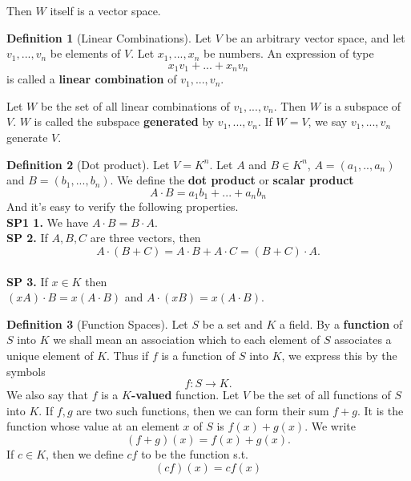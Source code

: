 \documentclass{book}
\theoremstyle{definition}
\newtheorem{definition}{Definition}[section]
\begin{document}
Then $W$ itself is a vector space.
\begin{definition}[Linear Combinations]
    Let $V$ be an arbitrary vector space, and let $v_1, ..., v_n$ be elements of $V$. Let $x_1, ..., x_n$ be numbers. An expression of type
    \begin{equation*}
        x_1v_1 + ... + x_nv_n
    \end{equation*}
    is called a \textbf{linear combination} of $v_1, ..., v_n$.
\end{definition}
Let $W$ be the set of all linear combinations of $v_1,...,v_n$. Then $W$ is a subspace of $V$. $W$ is called the subspace \textbf{generated} by $v_1,...,v_n$. If $W=V$, we say $v_1,...,v_n$ generate $V$.
\begin{definition}[Dot product]
    Let $V = K^n$. Let $A$ and $B \in K^n$, $A=(a_1,..,a_n)$ and $B=(b_1,...,b_n)$. We define the \textbf{dot product} or \textbf{scalar product}
    \begin{equation*}
        A \cdot B = a_1b_1 + ... + a_nb_n
    \end{equation*}
    And it's easy to verify the following properties.
    \\ \textbf{SP1 1.} We have $A \cdot B = B \cdot A$.
    \\ \textbf{SP 2.} If $A,B,C$ are three vectors, then
    \begin{equation*}
        A \cdot (B+C) = A \cdot B + A \cdot C = (B + C) \cdot A.
    \end{equation*}
    \\ \textbf{SP 3.} If $x \in K$ then
    \\ $(xA)\cdot B = x(A\cdot B)$ and $A \cdot (xB) = x(A \cdot B)$.
\end{definition}
\begin{definition}[Function Spaces]
    Let $S$ be a set and $K$ a field. By a \textbf{function} of $S$ into $K$ we shall mean an association which to each element of $S$ associates a unique element of $K$. Thus if $f$ is a function of $S$ into $K$, we express this by the symbols
    \begin{equation*}
        f: S \rightarrow K.
    \end{equation*}
    We also say that $f$ is a $K$\textbf{-valued} function. Let $V$ be the set of all functions of $S$ into $K$. If $f,g$ are two such functions, then we can form their sum $f+g$. It is the function whose value at an element $x$ of $S$ is $f(x) + g(x)$. We write
    \begin{equation*}
        (f+g)(x) = f(x) + g(x).
    \end{equation*}
    If $c \in K$, then we define $cf$ to be the function s.t.
    \begin{equation*}
        (cf)(x) = cf(x)
    \end{equation*}
\end{definition}
\end{document}
